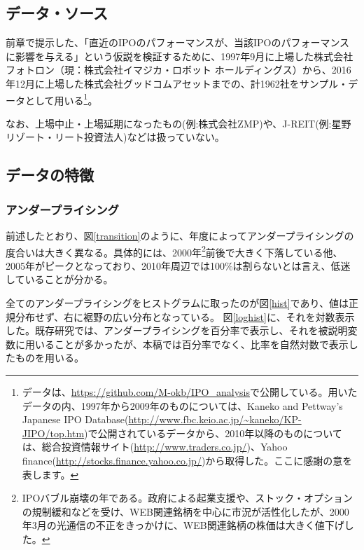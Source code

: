 \documentclass{jsarticle}
\begin{document}
\subsection{データ・ソース}
前章で提示した、「直近のIPOのパフォーマンスが、当該IPOのパフォーマンスに影響を与える」という仮説を検証するために、1997年9月に上場した株式会社フォトロン（現：株式会社イマジカ・ロボット ホールディングス）から、2016年12月に上場した株式会社グッドコムアセットまでの、計1962社をサンプル・データとして用いる\footnote[7]{データは、\url{https://github.com/M-okb/IPO_analysis}で公開している。用いたデータの内、1997年から2009年のものについては、Kaneko and Pettway’s Japanese IPO Database(\url{http://www.fbc.keio.ac.jp/~kaneko/KP-JIPO/top.htm})で公開されているデータから、2010年以降のものについては、総合投資情報サイト(\url{http://www.traders.co.jp/})、Yahoo finance(\url{http://stocks.finance.yahoo.co.jp/})から取得した。ここに感謝の意を表します。}。\par
なお、上場中止・上場延期になったもの(例:株式会社ZMP)や、J-REIT(例:星野リゾート・リート投資法人)などは扱っていない。\par

\subsection{データの特徴}
\subsubsection{アンダープライシング}
前述したとおり、図\ref{transition}のように、年度によってアンダープライシングの度合いは大きく異なる。具体的には、2000年\footnote[8]{IPOバブル崩壊の年である。政府による起業支援や、ストック・オプションの規制緩和などを受け、WEB関連銘柄を中心に市況が活性化したが、2000年3月の光通信の不正をきっかけに、WEB関連銘柄の株価は大きく値下げした。}前後で大きく下落している他、2005年がピークとなっており、2010年周辺では100\%は割らないとは言え、低迷していることが分かる。\par
全てのアンダープライシングをヒストグラムに取ったのが図\ref{hist}であり、値は正規分布せず、右に裾野の広い分布となっている。
図\ref{loghist}に、それを対数表示した。既存研究では、アンダープライシングを百分率で表示し、それを被説明変数に用いることが多かったが、本稿では百分率でなく、比率を自然対数で表示したものを用いる。\par

\newpage
\end{document}
